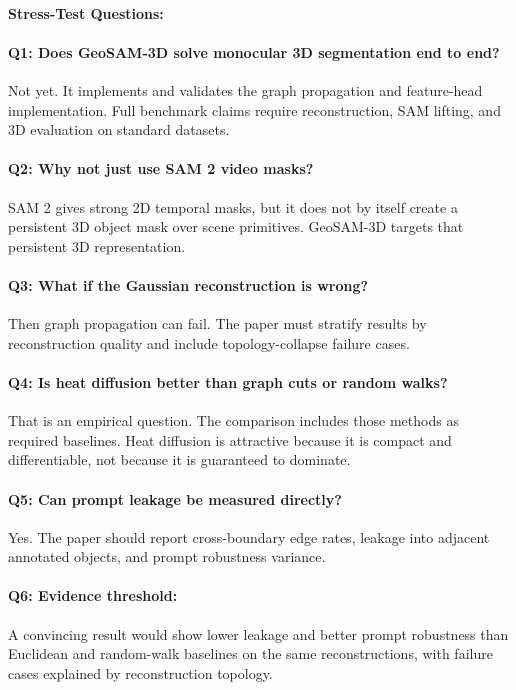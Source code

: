 \documentclass{article}
\begin{document}
\paragraph{Stress-Test Questions:}

\paragraph{Q1: Does GeoSAM-3D solve monocular 3D segmentation end to end?}
Not yet. It implements and validates the graph propagation and feature-head implementation. Full benchmark claims require reconstruction, SAM lifting, and 3D evaluation on standard datasets.

\paragraph{Q2: Why not just use SAM 2 video masks?}
SAM 2 gives strong 2D temporal masks, but it does not by itself create a persistent 3D object mask over scene primitives. GeoSAM-3D targets that persistent 3D representation.

\paragraph{Q3: What if the Gaussian reconstruction is wrong?}
Then graph propagation can fail. The paper must stratify results by reconstruction quality and include topology-collapse failure cases.

\paragraph{Q4: Is heat diffusion better than graph cuts or random walks?}
That is an empirical question. The comparison includes those methods as required baselines. Heat diffusion is attractive because it is compact and differentiable, not because it is guaranteed to dominate.

\paragraph{Q5: Can prompt leakage be measured directly?}
Yes. The paper should report cross-boundary edge rates, leakage into adjacent annotated objects, and prompt robustness variance.

\paragraph{Q6: Evidence threshold:}
A convincing result would show lower leakage and better prompt robustness than Euclidean and random-walk baselines on the same reconstructions, with failure cases explained by reconstruction topology.
\end{document}
